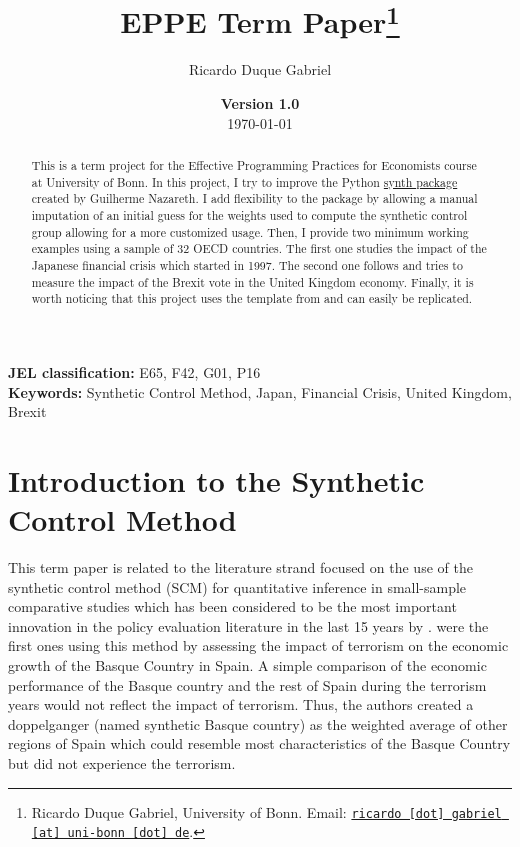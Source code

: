 \documentclass[11pt, a4paper, leqno]{article}
\begin{document}
\title{EPPE Term Paper\thanks{Ricardo Duque Gabriel, University of Bonn. Email: \href{mailto:ricardo.gabriel@uni-bonn.de}{\nolinkurl{ricardo [dot] gabriel [at] uni-bonn [dot] de}}.}}

\author{Ricardo Duque Gabriel}

\date{
{\bf Version 1.0} 
\\[1ex] 
\today
}

\maketitle


\begin{abstract}
	This is a term project for the Effective Programming Practices for Economists course at University of Bonn. In this project, I try to improve the Python \href{https://github.com/gnazareths/synth}{synth package} created by Guilherme Nazareth. I add flexibility to the package by allowing a manual imputation of an initial guess for the weights used to compute the synthetic control group allowing for a more customized usage. Then, I provide two minimum working examples using a sample of 32 OECD countries. The first one studies the impact of the Japanese financial crisis which started in 1997. The second one follows \citet{Born2018} and tries to measure the impact of the Brexit vote in the United Kingdom economy. Finally, it is worth noticing that this project uses the template from \citet{GaudeckerEconProjectTemplates} and can easily be replicated.
\end{abstract}
\vspace{5em}

\textbf{JEL classification:} E65, F42, G01, P16 \\

\textbf{Keywords:} Synthetic Control Method, Japan, Financial Crisis, United Kingdom, Brexit

\clearpage

\section{Introduction to the Synthetic Control Method}
\label{sec: Introduction}

This term paper is related to the literature strand focused on the use of the synthetic control method (SCM) for quantitative inference in small-sample comparative studies which has been considered to be  the most important innovation in the policy evaluation literature in the last 15 years by \citet{Athey2017}. \citet{Abadie2003} were the first ones using this method by assessing the impact of terrorism on the economic growth of the Basque Country in Spain. A  simple  comparison  of  the  economic  performance  of the Basque country and the rest of Spain during the terrorism years would not reflect the impact of terrorism. Thus, the authors created a doppelganger (named synthetic Basque country) as the weighted average of other regions of Spain which could resemble most characteristics of the Basque Country but did not experience the terrorism. \\
\end{document}
